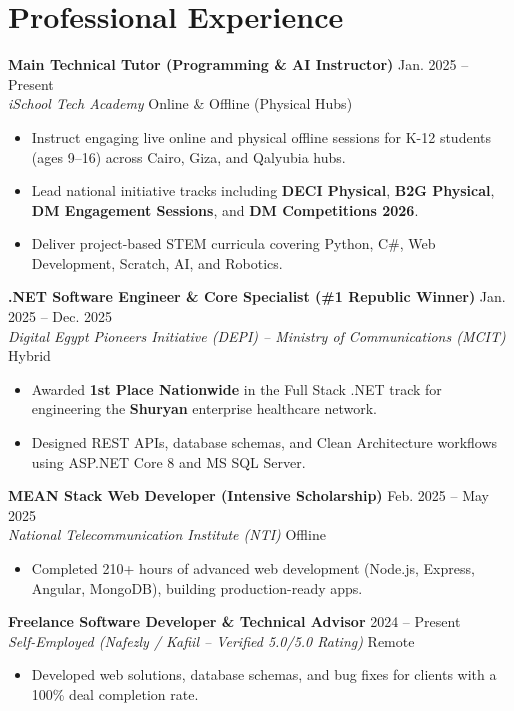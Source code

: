 \documentclass[11pt,a4paper]{article}
\begin{document}
\section{Professional Experience}

\textbf{Main Technical Tutor (Programming \& AI Instructor)} \hfill Jan. 2025 -- Present \\
\textit{iSchool Tech Academy} \hfill Online \& Offline (Physical Hubs)
\begin{itemize}[leftmargin=*, nosep]
    \item Instruct engaging live online and physical offline sessions for K-12 students (ages 9--16) across Cairo, Giza, and Qalyubia hubs.
    \item Lead national initiative tracks including \textbf{DECI Physical}, \textbf{B2G Physical}, \textbf{DM Engagement Sessions}, and \textbf{DM Competitions 2026}.
    \item Deliver project-based STEM curricula covering Python, C\#, Web Development, Scratch, AI, and Robotics.
\end{itemize}

\textbf{.NET Software Engineer \& Core Specialist (\#1 Republic Winner)} \hfill Jan. 2025 -- Dec. 2025 \\
\textit{Digital Egypt Pioneers Initiative (DEPI) -- Ministry of Communications (MCIT)} \hfill Hybrid
\begin{itemize}[leftmargin=*, nosep]
    \item Awarded \textbf{1st Place Nationwide} in the Full Stack .NET track for engineering the \textbf{Shuryan} enterprise healthcare network.
    \item Designed REST APIs, database schemas, and Clean Architecture workflows using ASP.NET Core 8 and MS SQL Server.
\end{itemize}

\textbf{MEAN Stack Web Developer (Intensive Scholarship)} \hfill Feb. 2025 -- May 2025 \\
\textit{National Telecommunication Institute (NTI)} \hfill Offline
\begin{itemize}[leftmargin=*, nosep]
    \item Completed 210+ hours of advanced web development (Node.js, Express, Angular, MongoDB), building production-ready apps.
\end{itemize}

\textbf{Freelance Software Developer \& Technical Advisor} \hfill 2024 -- Present \\
\textit{Self-Employed (Nafezly / Kafiil -- Verified 5.0/5.0 Rating)} \hfill Remote
\begin{itemize}[leftmargin=*, nosep]
    \item Developed web solutions, database schemas, and bug fixes for clients with a 100\% deal completion rate.
\end{itemize}
\end{document}
